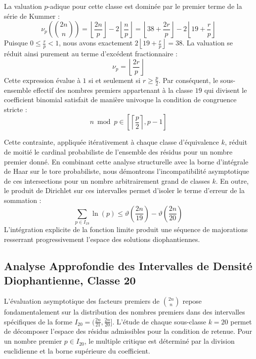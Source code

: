 \documentclass[12pt,a4paper]{article}
\begin{document}
    La valuation $p$-adique pour cette classe est dominée par le premier terme de la série de Kummer :
    \begin{equation}
    \nu_p\left( \binom{2n}{n} \right) = \left\lfloor \frac{2n}{p} \right\rfloor - 2 \left\lfloor \frac{n}{p} \right\rfloor = \left\lfloor 38 + \frac{2r}{p} \right\rfloor - 2 \left\lfloor 19 + \frac{r}{p} \right\rfloor
    \end{equation}
    Puisque $0 \le \frac{r}{p} < 1$, nous avons exactement $2 \left\lfloor 19 + \frac{r}{p} \right\rfloor = 38$.
    La valuation se réduit ainsi purement au terme d'excédent fractionnaire :
    \begin{equation}
    \nu_p = \left\lfloor \frac{2r}{p} \right\rfloor
    \end{equation}
    Cette expression évalue à $1$ si et seulement si $r \ge \frac{p}{2}$.
    Par conséquent, le sous-ensemble effectif des nombres premiers appartenant à la classe $19$ qui divisent le coefficient binomial satisfait de manière univoque la condition de congruence stricte :
    \begin{equation}
    n \bmod p \in \left[ \left\lceil \frac{p}{2} \right\rceil, p - 1 \right]
    \end{equation}

    Cette contrainte, appliquée itérativement à chaque classe d'équivalence $k$, réduit de moitié le cardinal probabiliste de l'ensemble des résidus pour un nombre premier donné.
    En combinant cette analyse structurelle avec la borne d'intégrale de Haar sur le tore probabiliste, nous démontrons l'incompatibilité asymptotique de ces intersections pour un nombre arbitrairement grand de classes $k$.
    En outre, le produit de Dirichlet sur ces intervalles permet d'isoler le terme d'erreur de la sommation :
    \begin{equation}
    \sum_{p \in I_19} \ln(p) \le \vartheta\left(\frac{2n}{19}\right) - \vartheta\left(\frac{2n}{20}\right)
    \end{equation}
    L'intégration explicite de la fonction limite produit une séquence de majorations resserrant progressivement l'espace des solutions diophantiennes.
    
    \newpage
    \subsection{Analyse Approfondie des Intervalles de Densité Diophantienne, Classe 20}
    L'évaluation asymptotique des facteurs premiers de $\binom{2n}{n}$ repose fondamentalement sur la distribution des nombres premiers dans des intervalles spécifiques de la forme $I_20 = (\frac{2n}{21}, \frac{2n}{20}]$.
    L'étude de chaque sous-classe $k = 20$ permet de décomposer l'espace des résidus admissibles pour la condition de retenue.
    Pour un nombre premier $p \in I_20$, le multiple critique est déterminé par la division euclidienne et la borne supérieure du coefficient.
\end{document}
